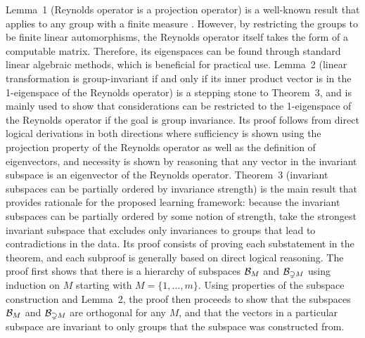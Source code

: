 Lemma~1 (Reynolds operator is a projection operator) is a well-known result that applies to any group with a finite measure \parencite{Mumford:1994}. However, by restricting the groups to be finite linear automorphisms, the Reynolds operator itself takes the form of a computable matrix. Therefore, its eigenspaces can be found through standard linear algebraic methods, which is beneficial for practical use. Lemma~2 (linear transformation is group-invariant if and only if its inner product vector is in the 1-eigenspace of the Reynolds operator) is a stepping stone to Theorem~3, and is mainly used to show that considerations can be restricted to the 1-eigenspace of the Reynolds operator if the goal is group invariance. Its proof follows from direct logical derivations in both directions where sufficiency is shown using the projection property of the Reynolds operator as well as the definition of eigenvectors, and necessity is shown by reasoning that any vector in the invariant subspace is an eigenvector of the Reynolds operator. Theorem~3 (invariant subspaces can be partially ordered by invariance strength) is the main result that provides rationale for the proposed learning framework: because the invariant subspaces can be partially ordered by some notion of strength, take the strongest invariant subspace that excludes only invariances to groups that lead to contradictions in the data. Its proof consists of proving each substatement in the theorem, and each subproof is generally based on direct logical reasoning. The proof first shows that there is a hierarchy of subspaces $\mathcal{B}_M$ and $\mathcal{B}_{\supsetneq M}$ using induction on $M$ starting with $M=\{1,\ldots,m\}$. Using properties of the subspace construction and Lemma~2, the proof then proceeds to show that the subspaces $\mathcal{B}_M$ and $\mathcal{B}_{\supsetneq M}$ are orthogonal for any $M$, and that the vectors in a particular subspace are invariant to only groups that the subspace was constructed from.


